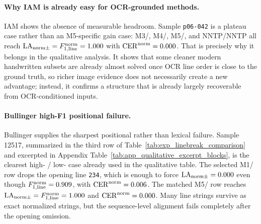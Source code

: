 \paragraph{Why IAM is already easy for OCR-grounded methods.}
IAM shows the absence of measurable headroom. Sample \texttt{p06-042} is a plateau case rather than an M5-specific gain case: M3/\GPTFiveMarchShort{}, M4/\GPTFiveMarchShort{}, M5/\GPTFiveShort{}, and NNTP/NNTP all reach \(\mathrm{LA}_{\mathrm{norm}\pm}=F_{1,\mathrm{line}}^{\mathrm{norm}}=1.000\) with \(\mathrm{CER}^{\mathrm{norm}}=0.000\). That is precisely why it belongs in the qualitative analysis. It shows that some cleaner modern handwritten subsets are already almost solved once OCR line order is close to the ground truth, so richer image evidence does not necessarily create a new advantage; instead, it confirms a structure that is already largely recoverable from OCR-conditioned inputs.

\paragraph{Bullinger high-F1 positional failure.}
Bullinger supplies the sharpest positional rather than lexical failure. Sample 12517, summarized in the third row of Table~\ref{tab:exp_linebreak_comparison} and excerpted in Appendix Table~\ref{tab:app_qualitative_excerpt_blocks}, is the clearest high-\LineFOneNorm{} / low-\LANormCombined{} case already used in the qualitative table. The selected M1/\GPTFiveMarchShort{} row drops the opening line \texttt{234}, which is enough to force \(\mathrm{LA}_{\mathrm{norm}\pm}=0.000\) even though \(F_{1,\mathrm{line}}^{\mathrm{norm}}=0.909\), with \(\mathrm{CER}^{\mathrm{norm}}=0.006\). The matched M5/\GPTFiveShort{} row reaches \(\mathrm{LA}_{\mathrm{norm}\pm}=F_{1,\mathrm{line}}^{\mathrm{norm}}=1.000\) and \(\mathrm{CER}^{\mathrm{norm}}=0.000\). Many line strings survive as exact normalized strings, but the sequence-level alignment fails completely after the opening omission.

